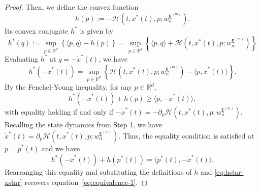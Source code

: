 \documentclass[10pt,a4paper]{amsart}
\newcommand{\R}{\mathbb{R}}
\begin{document}
\begin{proof}
Then, we define the convex function 
\begin{equation*}
    h(p) := -\mathcal{H}(t,x^*(t),p;w_n^{\bm{\xi}^{(m)}}). 
\end{equation*}
Its convex conjugate $h^*$ is given by 
\begin{equation*}
    h^*(q) := \sup_{p\in \mathbb{R}^d}\left\{ \langle p, q\rangle - h(p) \right\} = \sup_{p\in \R^d}\left\{ \langle p, q\rangle +\mathcal{H}(t,x^*(t), p;w_n^{\bm{\xi}^{(m)}}) \right\}
\end{equation*}
Evaluating $h^*$ at $q = -\dot{x}^*(t)$, we have 
\begin{equation}
\label{eq:hstar-xstar}
    h^*(-\dot{x}^*(t)) = \sup_{p\in \R^d} \left\{ \mathcal{H}(t,x^*(t), p;w_n^{\bm{\xi}^{(m)}}) - \langle p, \dot{x}^*(t)\rangle \right\}. 
\end{equation}
By the Fenchel-Young inequality, for any $p\in \R^d$, 
\begin{equation*}
    h^*(-\dot{x}^*(t)) + h(p) \ge \langle p, -\dot{x}^*(t) \rangle, 
\end{equation*}
with equality holding if and only if $-\dot{x}^*(t) =  -\partial_p \mathcal{H}(t,x^*(t),p;w_n^{\bm{\xi}^{(m)}})$. 
Recalling the state dynamics from Step 1, we have $\dot{x}^*(t) =  \partial_p \mathcal{H}(t,x^*(t),p;w_n^{\bm{\xi}^{(m)}})$. 
Thus, the equality condition is satisfied at $p = p^*(t)$ and we have 
\begin{equation*}
    h^*(-\dot{x}^*(t)) + h(p^*(t)) = \langle p^*(t), -\dot{x}^*(t) \rangle.
\end{equation*}
Rearranging this equality and substituting the definitions of $h$ and \eqref{eq:hstar-xstar} recovers equation~\eqref{eq:equivalence-1}. 


\end{proof}
\end{document}
